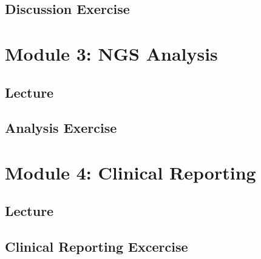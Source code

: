 \documentclass[
]{book}
\begin{document}
\section{Discussion Exercise}\label{discussion-exercise}

\chapter{Module 3: NGS Analysis}\label{module-3-ngs-analysis}

\section{Lecture}\label{lecture-2}

\section{Analysis Exercise}\label{analysis-exercise}

\chapter{Module 4: Clinical Reporting}\label{module-4-clinical-reporting}

\section{Lecture}\label{lecture-3}

\section{Clinical Reporting Excercise}\label{clinical-reporting-excercise}

  
\end{document}
